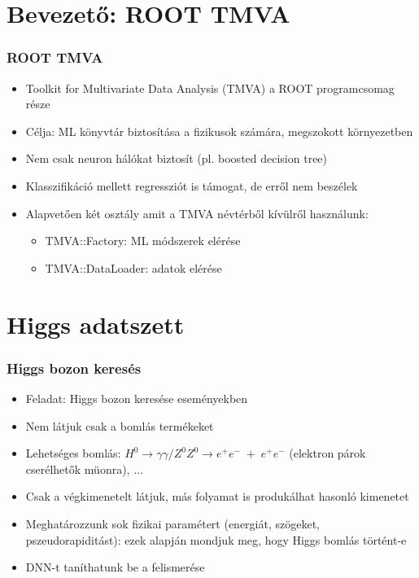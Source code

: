 \documentclass{beamer}
\begin{document}
\section{Bevezető: ROOT TMVA}
\begin{frame}
\frametitle{ROOT TMVA}
\begin{itemize}
  \setlength{\itemsep}{12pt}
  \item Toolkit for Multivariate Data Analysis (TMVA) a ROOT programcsomag része
  \item Célja: ML könyvtár biztosítása a fizikusok számára, megszokott környezetben
  \item Nem csak neuron hálókat biztosít (pl. boosted decision tree)
  \item Klasszifikáció mellett regressziót is támogat, de erről nem beszélek
  \item Alapvetően két osztály amit a TMVA névtérből kívülről használunk:
  	\begin{itemize}
  	  \setlength{\itemsep}{6pt}
  		\item TMVA::Factory: ML módszerek elérése
  		\item TMVA::DataLoader: adatok elérése
  	\end{itemize}
\end{itemize}
\end{frame}


\section{Higgs adatszett}
\begin{frame}
\frametitle{Higgs bozon keresés}
\begin{itemize}
  \setlength{\itemsep}{12pt}
  \item Feladat: Higgs bozon keresése eseményekben
  \item Nem látjuk csak a bomlás termékeket
  \item Lehetséges bomlás: $H^0\rightarrow \gamma\gamma/Z^0Z^0\rightarrow e^+e^-\;+\;e^+e^-$ (elektron párok cserélhetők müonra), ...
  \item Csak a végkimenetelt látjuk, más folyamat is produkálhat hasonló kimenetet
  \item Meghatározzunk sok fizikai paramétert (energiát, szögeket, pszeudorapiditást): ezek alapján mondjuk meg, hogy Higgs bomlás történt-e
  \item DNN-t taníthatunk be a felismerése
\end{itemize}
\end{frame}
\end{document}
